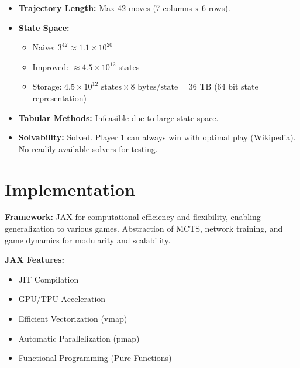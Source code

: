 \documentclass[aspectratio=169,xcolor=dvipsnames]{beamer}
\begin{document}
\begin{frame}{}
    \begin{itemize}
        \item \textbf{Trajectory Length:} Max 42 moves (7 columns x 6 rows).
        \item \textbf{State Space:}
            \begin{itemize}
                \item Naive: $3^{42} \approx 1.1 \times 10^{20}$
                \item Improved: $\approx 4.5 \times 10^{12}$ states
                \item Storage: $4.5 \times 10^{12} \text{ states} \times 8 \text{ bytes/state} = 36 \text{ TB}$ (64 bit state representation)
            \end{itemize}
        \item \textbf{Tabular Methods:} Infeasible due to large state space.
        \item \textbf{Solvability:} Solved. Player 1 can always win with optimal play (Wikipedia). No readily available solvers for testing.
    \end{itemize}
\end{frame}

\section{Implementation}

\begin{frame}{}
\textbf{Framework:} JAX for computational efficiency and flexibility, enabling generalization to various games.  Abstraction of MCTS, network training, and game dynamics for modularity and scalability. 

\vspace{2.5em}

\textbf{JAX Features:}
\begin{itemize}
    \item JIT Compilation
    \item GPU/TPU Acceleration
    \item Efficient Vectorization (vmap)
    \item Automatic Parallelization (pmap)
    \item Functional Programming (Pure Functions)
\end{itemize}
\end{frame}
\end{document}
